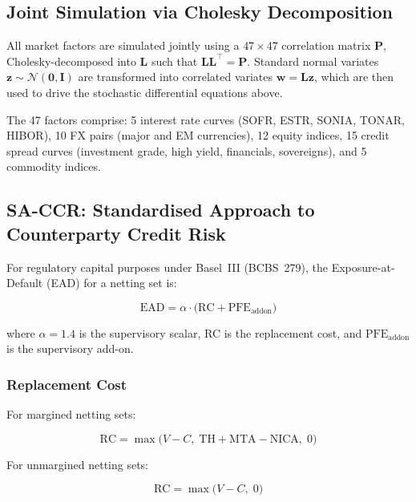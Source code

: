 \documentclass[11pt,a4paper]{article}
\begin{document}
\subsection{Joint Simulation via Cholesky Decomposition}

All market factors are simulated jointly using a $47 \times 47$ correlation
matrix $\mathbf{P}$, Cholesky-decomposed into $\mathbf{L}$ such that
$\mathbf{L}\mathbf{L}^\top = \mathbf{P}$. Standard normal variates
$\mathbf{z} \sim \mathcal{N}(\mathbf{0}, \mathbf{I})$ are transformed into
correlated variates $\mathbf{w} = \mathbf{L}\mathbf{z}$, which are then
used to drive the stochastic differential equations above.

The 47 factors comprise: 5 interest rate curves (SOFR, ESTR, SONIA, TONAR,
HIBOR), 10 FX pairs (major and EM currencies), 12 equity indices, 15 credit
spread curves (investment grade, high yield, financials, sovereigns), and
5 commodity indices.

\subsection{SA-CCR: Standardised Approach to Counterparty Credit Risk}

For regulatory capital purposes under Basel~III (BCBS~279), the
Exposure-at-Default (EAD) for a netting set is:

\begin{equation}
  \text{EAD} = \alpha \cdot \bigl(\text{RC} + \text{PFE}_{\text{addon}}\bigr)
  \label{eq:sa_ccr_ead}
\end{equation}

where $\alpha = 1.4$ is the supervisory scalar, RC is the replacement cost, and
$\text{PFE}_{\text{addon}}$ is the supervisory add-on.

\subsubsection{Replacement Cost}

For margined netting sets:

\begin{equation}
  \text{RC} = \max\!\bigl(V - C,\; \text{TH} + \text{MTA} - \text{NICA},\; 0\bigr)
  \label{eq:rc_margined}
\end{equation}

For unmargined netting sets:

\begin{equation}
  \text{RC} = \max\!\bigl(V - C,\; 0\bigr)
  \label{eq:rc_unmargined}
\end{equation}
\end{document}
